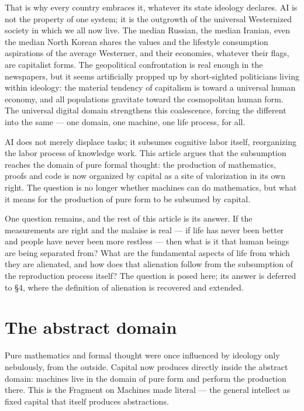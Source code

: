 \documentclass[11pt]{article}
\begin{document}
That is why every country embraces it, whatever its state ideology
declares. AI is not the property of one system; it is the outgrowth of
the universal Westernized society in which we all now live. The median
Russian, the median Iranian, even the median North Korean shares the
values and the lifestyle consumption aspirations of the average
Westerner, and their economies, whatever their flags, are capitalist
forms. The geopolitical confrontation is real enough in the newspapers,
but it seems artificially propped up by short-sighted politicians living
within ideology: the material tendency of capitalism is toward a
universal human economy, and all populations gravitate toward the
cosmopolitan human form. The universal digital domain strengthens this
coalescence, forcing the different into the same --- one domain, one
machine, one life process, for all.

AI does not merely displace tasks; it subsumes cognitive labor itself,
reorganizing the labor process of knowledge work. This article argues
that the subsumption reaches the domain of pure formal thought: the
production of mathematics, proofs and code is now organized by capital
as a site of valorization in its own right. The question is no longer
whether machines can do mathematics, but what it means for the
production of pure form to be subsumed by capital.

One question remains, and the rest of this article is its answer. If
the measurements are right and the malaise is real --- if life has never
been better and people have never been more restless --- then what is it
that human beings are being separated from? What are the fundamental
aspects of life from which they are alienated, and how does that
alienation follow from the subsumption of the reproduction process
itself? The question is posed here; its answer is deferred to §4, where
the definition of alienation is recovered and extended.

\section{The abstract domain}

Pure mathematics and formal thought were once influenced by ideology
only nebulously, from the outside. Capital now produces directly inside
the abstract domain: machines live in the domain of pure form and
perform the production there. This is the Fragment on Machines made
literal --- the general intellect as fixed capital that itself produces
abstractions.
\end{document}

